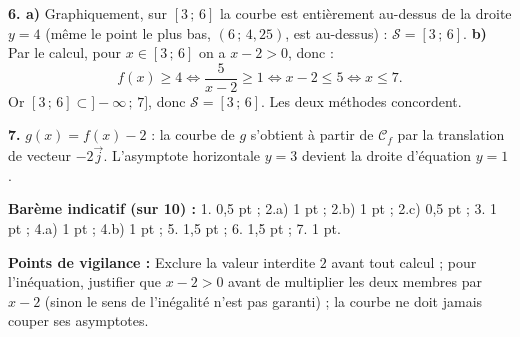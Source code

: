 \documentclass[11pt]{article}
\begin{document}
\begin{corrige}
\textbf{6. a)} Graphiquement, sur $[3\,;\,6]$ la courbe est entièrement au-dessus de la droite $y=4$ (même le point le plus bas, $(6\,;\,4,25)$, est au-dessus) : $\mathcal{S}=[3\,;\,6]$.
\textbf{b)} Par le calcul, pour $x\in[3\,;\,6]$ on a $x-2>0$, donc :
\[ f(x)\geq 4\Leftrightarrow \frac{5}{x-2}\geq 1\Leftrightarrow x-2\leq 5\Leftrightarrow x\leq 7. \]
Or $[3\,;\,6]\subset]-\infty\,;\,7]$, donc $\mathcal{S}=[3\,;\,6]$. Les deux méthodes concordent.

\textbf{7.} $g(x)=f(x)-2$ : la courbe de $g$ s'obtient à partir de $\mathcal{C}_{f}$ par la translation de vecteur $-2\vec{j}$. L'asymptote horizontale $y=3$ devient la droite d'équation $y=1$.

\textbf{Barème indicatif (sur 10) :} 1. 0,5 pt ; 2.a) 1 pt ; 2.b) 1 pt ; 2.c) 0,5 pt ; 3. 1 pt ; 4.a) 1 pt ; 4.b) 1 pt ; 5. 1,5 pt ; 6. 1,5 pt ; 7. 1 pt.

\textbf{Points de vigilance :} Exclure la valeur interdite $2$ avant tout calcul ; pour l'inéquation, justifier que $x-2>0$ avant de multiplier les deux membres par $x-2$ (sinon le sens de l'inégalité n'est pas garanti) ; la courbe ne doit jamais couper ses asymptotes.
\end{corrige}
\end{document}
